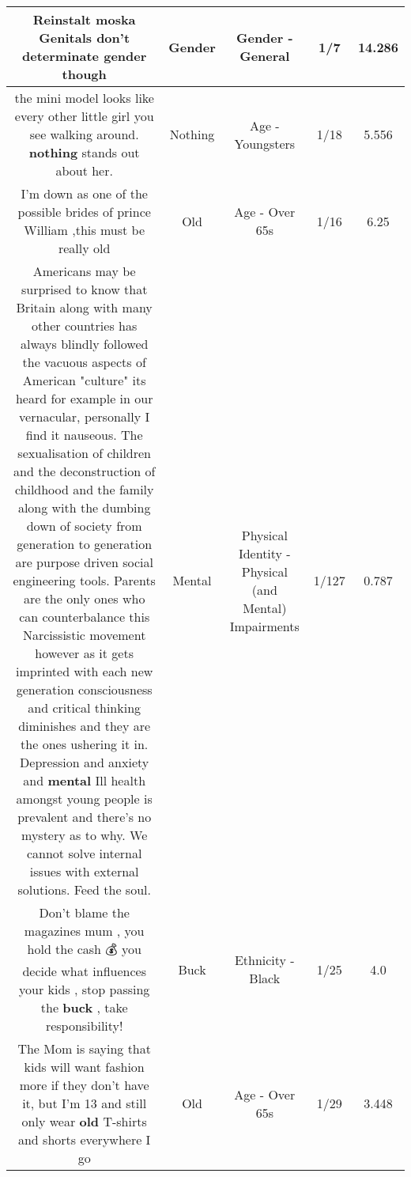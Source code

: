 \documentclass[11pt]{article}
\newlength\mylength
\begin{document}
\begin{center}
\begin{longtable}{|C{.65\mylength}|C{.30\mylength}|C{.12\mylength}|C{.12\mylength}|C{.12\mylength}|}
  \small Reinstalt moska Genitals don't determinate \textbf{gender} though\normalsize   & Gender & Gender - General & 1/7 & 14.286 \\  \hline
  \small the mini model looks like every other little girl you see walking around. \textbf{nothing} stands out about her.\normalsize   & Nothing & Age - Youngsters & 1/18 & 5.556 \\  \hline
  \small I'm down as one of the possible brides of prince William ,this must be really old\normalsize   & Old & Age - Over 65s & 1/16 & 6.25 \\  \hline
  \small Americans may be surprised to know that Britain along with many other countries has always blindly followed the vacuous aspects of American "culture" its heard for example in our vernacular, personally I find it nauseous.  The sexualisation of children and the deconstruction of childhood and the family along with the dumbing down of society from generation to generation are purpose driven social engineering tools. Parents are the only ones who can counterbalance this Narcissistic movement however as it gets imprinted with each new generation consciousness and critical thinking diminishes and they are the ones ushering it in. Depression and anxiety and \textbf{mental} Ill health amongst young people is prevalent and there's no mystery as to why. We cannot solve internal issues with external solutions. Feed the soul.\normalsize   & Mental & Physical Identity - Physical (and Mental) Impairments & 1/127 & 0.787 \\  \hline
  \small Don't blame the magazines mum , you hold the cash 💰 you decide what influences your kids , stop passing the \textbf{buck} , take responsibility!\normalsize   & Buck & Ethnicity - Black & 1/25 & 4.0 \\  \hline
  \small The Mom is saying that kids will want fashion more if they don't have it, but I'm 13 and still only wear \textbf{old} T-shirts and shorts everywhere I go\normalsize   & Old & Age - Over 65s & 1/29 & 3.448 \\  \hline

\end{longtable}
\end{center}
\end{document}
